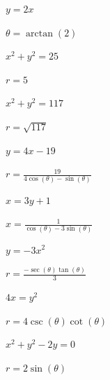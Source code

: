 \documentclass{ximera}
\begin{document}
\begin{question}
\begin{problem} \label{solvethetafour} 
$y = 2x$

\begin{solution}
$\theta = \arctan(2)$
\end{solution}
\end{problem}

\begin{problem}
$x^2 + y^2 = 25$

\begin{solution}
$r = 5$
\end{solution}
\end{problem}

\begin{problem}
$x^{2} + y^{2} = 117$

\begin{solution}
$r = \sqrt{117}$
\end{solution}
\end{problem}

\begin{problem}
$y = 4x - 19$

\begin{solution}
$r = \frac{19}{4\cos(\theta) - \sin(\theta)}$
\end{solution}
\end{problem}

\begin{problem}
$x = 3y + 1$

\begin{solution}
$x = \frac{1}{\cos(\theta) - 3\sin(\theta)}$
\end{solution}
\end{problem}

\begin{problem}
$y = -3x^{2}$

\begin{solution}
$r = \frac{-\sec(\theta)\tan(\theta)}{3}$
\end{solution}
\end{problem}

\begin{problem}
$4x = y^2$

\begin{solution}
$r = 4\csc(\theta)\cot(\theta)$
\end{solution}
\end{problem}

\begin{problem}
$x^2 + y^2 - 2y = 0$

\begin{solution}
$r=2\sin(\theta)$
\end{solution}
\end{problem}


\end{question}
\end{document}

